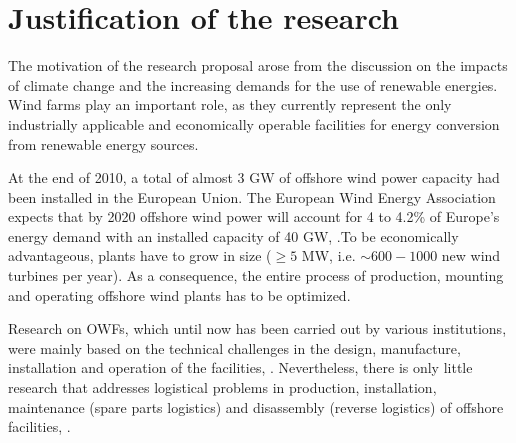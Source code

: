 \section{Justification of the research}
The motivation of the research proposal arose from the discussion on the impacts of climate change and the increasing demands for the use of renewable energies. Wind farms play an important role, as they currently represent the only industrially applicable and economically operable facilities for energy conversion from renewable energy sources.

At the end of 2010, a total of almost 3 GW of offshore wind power capacity had been installed in the European Union. The European Wind Energy Association expects that by 2020 offshore wind power will account for 4 to 4.2\% of Europe's energy demand with an installed capacity of 40 GW, \cite{EWEA2011, Kaldellis2013}.To be economically advantageous, plants have to grow in size ($\geq 5$ MW, i.e. $\sim600-1000$ new wind turbines per year). As a consequence, the entire process of production, mounting and operating offshore wind plants has to be optimized.

Research on OWFs, which until now has been carried out by various institutions, were mainly based on the technical challenges in the design, manufacture, installation and operation of the facilities, \cite{Miller2013, SerranoGonzalez2014, Perveen2014}. Nevertheless, there is only little research that addresses logistical problems in production, installation, maintenance (spare parts logistics) and disassembly (reverse logistics) of offshore facilities, \cite{Scholz2010, Lange2012, COMPIT11, COMPIT12, aitsimulation, thalji2012}.




